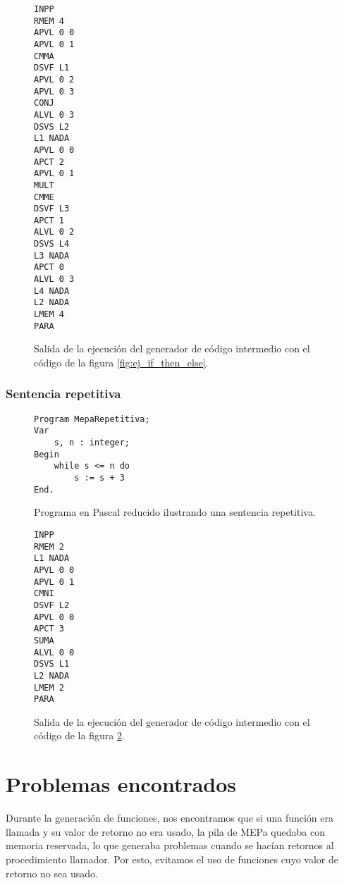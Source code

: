 \begin{figure}[H]
\begin{multicols}{3}
\begin{verbatim}
INPP
RMEM 4
APVL 0 0
APVL 0 1
CMMA
DSVF L1
APVL 0 2
APVL 0 3
CONJ
ALVL 0 3
DSVS L2
L1 NADA
APVL 0 0
APCT 2
APVL 0 1
MULT
CMME
DSVF L3
APCT 1
ALVL 0 2
DSVS L4
L3 NADA
APCT 0
ALVL 0 3
L4 NADA
L2 NADA
LMEM 4
PARA
\end{verbatim}
\end{multicols}
\caption{Salida de la ejecución del generador de código intermedio con el código de la figura \ref{fig:ej_if_then_else}.}
\label{fig:gen_ej_if_then_else}
\end{figure}

\subsubsection{Sentencia repetitiva}

\begin{figure}[H]
\begin{verbatim}
Program MepaRepetitiva;
Var
    s, n : integer;
Begin
    while s <= n do
        s := s + 3
End.
\end{verbatim}
\caption{Programa en Pascal reducido ilustrando una sentencia repetitiva.}
\label{fig:ej_while_do}
\end{figure}

\begin{figure}[H]
\begin{multicols}{2}
\begin{verbatim}
INPP
RMEM 2
L1 NADA
APVL 0 0
APVL 0 1
CMNI
DSVF L2
APVL 0 0
APCT 3
SUMA
ALVL 0 0
DSVS L1
L2 NADA
LMEM 2
PARA
\end{verbatim}
\end{multicols}
\caption{Salida de la ejecución del generador de código intermedio con el código de la figura \ref{fig:ej_while_do}.}
\label{fig:gen_ej_while_do}
\end{figure}

\section{Problemas encontrados}
Durante la generación de funciones, nos encontramos que si una función era llamada y su valor de retorno no era usado, la pila de MEPa quedaba con memoria reservada, lo que generaba problemas cuando se hacían retornos al procedimiento llamador. Por esto, evitamos el uso de funciones cuyo valor de retorno no sea usado.

